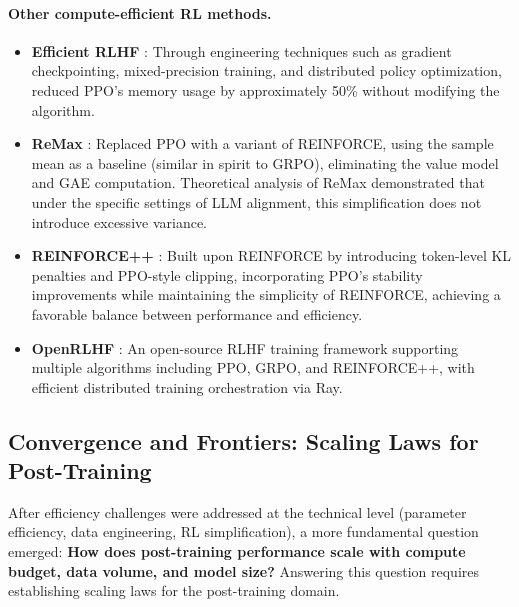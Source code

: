 \paragraph{Other compute-efficient RL methods.}
\begin{itemize}[leftmargin=2em]
  \item \textbf{Efficient RLHF} \cite{santacroce2023efficient}:
    Through engineering techniques such as gradient checkpointing,
    mixed-precision training, and distributed policy optimization,
    reduced PPO's memory usage by approximately 50\% without modifying the algorithm.

  \item \textbf{ReMax} \cite{li2023remax}:
    Replaced PPO with a variant of REINFORCE,
    using the sample mean as a baseline (similar in spirit to GRPO),
    eliminating the value model and GAE computation.
    Theoretical analysis of ReMax demonstrated that under the specific settings of LLM alignment,
    this simplification does not introduce excessive variance.

  \item \textbf{REINFORCE++} \cite{hu2025reinforcepp}:
    Built upon REINFORCE by introducing token-level KL penalties and PPO-style clipping,
    incorporating PPO's stability improvements while maintaining the simplicity of REINFORCE,
    achieving a favorable balance between performance and efficiency.

  \item \textbf{OpenRLHF} \cite{hu2024openrlhf}:
    An open-source RLHF training framework
    supporting multiple algorithms including PPO, GRPO, and REINFORCE++,
    with efficient distributed training orchestration via Ray.
\end{itemize}


\subsection{Convergence and Frontiers: Scaling Laws for Post-Training}
\label{sec:t7-scaling}

After efficiency challenges were addressed at the technical level (parameter efficiency, data engineering, RL simplification),
a more fundamental question emerged:
\textbf{How does post-training performance scale with compute budget, data volume, and model size?}
Answering this question requires establishing scaling laws for the post-training domain.

